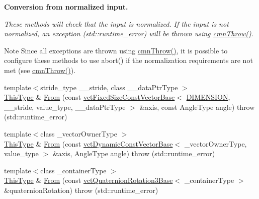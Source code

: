 \begin{Indent}{\bf Conversion from normalized input.}\par
{\em These methods will check that the input is normalized. If the input is not normalized, an exception ({\ttfamily std\-::runtime\-\_\-error}) will be thrown using \hyperlink{_minimal_cmn_8h_ad50e82cf9c9dbd0e6443c13e0d1a6f1a}{cmn\-Throw()}.

\begin{DoxyNote}{Note}
Since all exceptions are thrown using \hyperlink{_minimal_cmn_8h_ad50e82cf9c9dbd0e6443c13e0d1a6f1a}{cmn\-Throw()}, it is possible to configure these methods to use {\ttfamily abort()} if the normalization requirements are not met (see \hyperlink{_minimal_cmn_8h_ad50e82cf9c9dbd0e6443c13e0d1a6f1a}{cmn\-Throw()}). 
\end{DoxyNote}
}\begin{DoxyCompactItemize}
\item 
{\footnotesize template$<$stride\-\_\-type \-\_\-\-\_\-stride, class \-\_\-\-\_\-data\-Ptr\-Type $>$ }\\\hyperlink{classvct_axis_angle_rotation3_af654a8037b7b82a378f69cb1bfd9b8dd}{This\-Type} \& \hyperlink{classvct_axis_angle_rotation3_a296f32cc8359a9b986f1d15dd1834aa0}{From} (const \hyperlink{classvct_fixed_size_const_vector_base}{vct\-Fixed\-Size\-Const\-Vector\-Base}$<$ \hyperlink{classvct_axis_angle_rotation3_a278b4a98a62e4f5ff42ce055836240a9a778d22dfe29402d2cfdd381c1b870285}{D\-I\-M\-E\-N\-S\-I\-O\-N}, \-\_\-\-\_\-stride, value\-\_\-type, \-\_\-\-\_\-data\-Ptr\-Type $>$ \&axis, const Angle\-Type angle)  throw (std\-::runtime\-\_\-error)
\item 
{\footnotesize template$<$class \-\_\-vector\-Owner\-Type $>$ }\\\hyperlink{classvct_axis_angle_rotation3_af654a8037b7b82a378f69cb1bfd9b8dd}{This\-Type} \& \hyperlink{classvct_axis_angle_rotation3_a2debd6ae28a69c331f79f464e00c057d}{From} (const \hyperlink{classvct_dynamic_const_vector_base}{vct\-Dynamic\-Const\-Vector\-Base}$<$ \-\_\-vector\-Owner\-Type, value\-\_\-type $>$ \&axis, Angle\-Type angle)  throw (std\-::runtime\-\_\-error)
\item 
{\footnotesize template$<$class \-\_\-container\-Type $>$ }\\\hyperlink{classvct_axis_angle_rotation3_af654a8037b7b82a378f69cb1bfd9b8dd}{This\-Type} \& \hyperlink{classvct_axis_angle_rotation3_ad9d0c6340e9597487d9c96d568ccdc8b}{From} (const \hyperlink{classvct_quaternion_rotation3_base}{vct\-Quaternion\-Rotation3\-Base}$<$ \-\_\-container\-Type $>$ \&quaternion\-Rotation)  throw (std\-::runtime\-\_\-error)

\end{DoxyCompactItemize}
\end{Indent}
